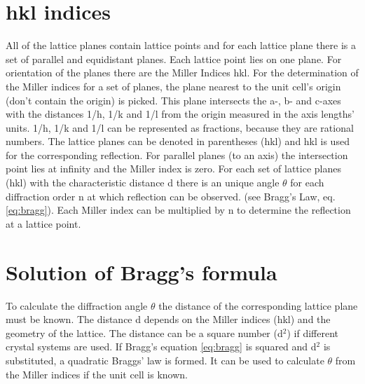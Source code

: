 \section{hkl indices}
 All of the lattice planes contain lattice points and for each lattice plane there is a set of parallel and equidistant planes. Each lattice point lies on one plane. 
 For orientation of the planes there are the Miller Indices hkl. For the determination of the Miller indices for a set of planes, the plane nearest to the unit cell's origin (don't contain the origin)  is picked. This plane intersects the a-, b- and c-axes with the distances 1/h, 1/k and 1/l from the origin  measured in the axis lengths' units. 1/h, 1/k and 1/l can be represented as fractions, because they are rational numbers. The lattice planes can be denoted in parentheses (hkl) and hkl is used for the corresponding reflection. For parallel planes (to an axis) the intersection point lies at infinity and the Miller index is zero. For each set of lattice planes (hkl) with the characteristic distance d there is an unique angle $\theta$ for each diffraction order n at which reflection can be observed. (see Bragg's Law, eq. \ref{eq:bragg}). Each Miller index can be multiplied by n to determine the reflection at a lattice point.
 
 

 

 \section{Solution of Bragg's formula}
 To calculate the diffraction angle $\theta$ the distance of the corresponding lattice plane must be known. The distance d depends on the Miller indices (hkl) and the geometry of the lattice. The distance can be a square number (d$^2$) if different crystal systems are used. If Bragg's equation \ref{eq:bragg} is squared and d$^2$ is substituted, a quadratic Braggs' law is formed. It can be used to calculate $\theta$ from the Miller indices if the unit cell is known.
 
 

